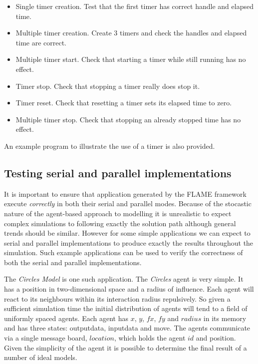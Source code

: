 \begin{itemize}
 \item Single timer creation. Test that the first timer has correct handle and elapsed time.
 \item Multiple timer creation. Create 3 timers and check the handles and elapsed time are correct.
 \item Multiple timer start. Check that starting a timer while still running has no effect.
 \item Timer stop. Check that stopping a timer really does stop it.
 \item Timer reset. Check that resetting a timer sets its elapsed time to zero.
 \item Multiple timer stop. Check that stopping an already stopped time has no effect.
\end{itemize}

An example program to illustrate the use of a timer is also provided.

\subsection{Testing serial and parallel implementations}
It is important to ensure that application generated by the FLAME framework execute \textsl{correctly} in both their serial and parallel modes. Because of the stocastic nature of the agent-based approach to modelling it is unrealistic to expect complex simulations to following exactly the solution path although general trends should be similar. However for some simple applications we can expect to serial and parallel implementations to produce exactly the results throughout the simulation. Such example applications can be used to verify the correctness of both the serial and parallel implementations.

The \textsl{Circles Model} is one such application. The \textsl{Circles} agent is very simple. It has a position in two-dimensional space and a radius of influence. Each agent will react to its neighbours within its interaction radius repulsively. So given a sufficient simulation time the initial distribution of agents will tend to a field of uniformly spaced agents. Each agent has $x$, $y$, $fx$, $fy$ and $radius$ in its memory and has three states: outputdata, inputdata and move. The agents communicate via a single message board, $location$, which holds the agent $id$ and position. Given the simplicity of the agent it is possible to determine the final result of a number of ideal models.

